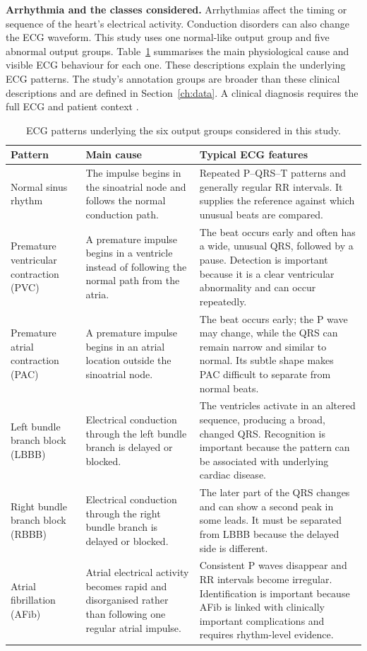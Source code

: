 \textbf{Arrhythmia and the classes considered.}
Arrhythmias affect the timing or sequence of the heart's electrical activity.
Conduction disorders can also change the ECG waveform. This study uses one
normal-like output group and five abnormal output groups. Table~\ref{tab:intro-arrhythmias} summarises the main
physiological cause and visible ECG behaviour for each one. These descriptions explain the underlying ECG patterns. The study's annotation
groups are broader than these clinical descriptions and are defined in
Section~\ref{ch:data}. A clinical diagnosis requires the full ECG and patient
context \cite{moody2001impact,dechazal2004heartbeat}.

\begin{table}[H]
\centering
\small
\caption{ECG patterns underlying the six output groups considered in this study.}
\label{tab:intro-arrhythmias}
\begin{tabular}{>{\raggedright\arraybackslash}p{2.2cm}>{\raggedright\arraybackslash}p{5.0cm}>{\raggedright\arraybackslash}p{5.4cm}}
\toprule
Pattern & Main cause & Typical ECG features\\
\midrule
Normal sinus rhythm & The impulse begins in the sinoatrial node and follows
the normal conduction path. & Repeated P--QRS--T patterns and generally regular
RR intervals. It supplies the reference against which unusual beats are
compared.\\
Premature ventricular contraction (PVC) & A premature impulse begins in a ventricle instead of following the normal
path from the atria. & The beat occurs early and often has a wide, unusual QRS,
followed by a pause. Detection is important because it is a clear ventricular
abnormality and can occur repeatedly.\\
Premature atrial contraction (PAC) & A premature impulse begins in an atrial location outside the sinoatrial
node. & The beat occurs early; the P wave may change, while the QRS can remain
narrow and similar to normal. Its subtle shape makes PAC difficult to separate
from normal beats.\\
Left bundle branch block (LBBB) & Electrical conduction through the left bundle branch is delayed or
blocked. & The ventricles activate in an altered sequence, producing a broad,
changed QRS. Recognition is important because the pattern can be associated
with underlying cardiac disease.\\
Right bundle branch block (RBBB) & Electrical conduction through the right bundle branch is delayed or
blocked. & The later part of the QRS changes and can show a second peak in some
leads. It must be separated from LBBB because the delayed side is different.\\
Atrial fibrillation (AFib) & Atrial electrical activity becomes rapid and disorganised rather than
following one regular atrial impulse. & Consistent P waves disappear and RR
intervals become irregular. Identification is important because AFib is linked
with clinically important complications and requires rhythm-level evidence.\\
\bottomrule
\end{tabular}
\end{table}

